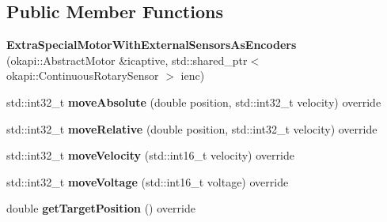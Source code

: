 \subsection*{Public Member Functions}
\begin{DoxyCompactItemize}
\item 
\mbox{\label{classExtraSpecialMotorWithExternalSensorsAsEncoders_a3fb898c76f246c08d0634933fea4a557}} 
{\bfseries Extra\+Special\+Motor\+With\+External\+Sensors\+As\+Encoders} (okapi\+::\+Abstract\+Motor \&icaptive, std\+::shared\+\_\+ptr$<$ okapi\+::\+Continuous\+Rotary\+Sensor $>$ ienc)
\item 
\mbox{\label{classExtraSpecialMotorWithExternalSensorsAsEncoders_af77f0f3c65fa7e19fd49a25b86694597}} 
std\+::int32\+\_\+t {\bfseries move\+Absolute} (double position, std\+::int32\+\_\+t velocity) override
\item 
\mbox{\label{classExtraSpecialMotorWithExternalSensorsAsEncoders_a688e2df620b1c931c448041ef2728966}} 
std\+::int32\+\_\+t {\bfseries move\+Relative} (double position, std\+::int32\+\_\+t velocity) override
\item 
\mbox{\label{classExtraSpecialMotorWithExternalSensorsAsEncoders_ae1378301e9848847026f342df66f6762}} 
std\+::int32\+\_\+t {\bfseries move\+Velocity} (std\+::int16\+\_\+t velocity) override
\item 
\mbox{\label{classExtraSpecialMotorWithExternalSensorsAsEncoders_a1dee79ad417eba651537ef56b32cd9c3}} 
std\+::int32\+\_\+t {\bfseries move\+Voltage} (std\+::int16\+\_\+t voltage) override
\item 
\mbox{\label{classExtraSpecialMotorWithExternalSensorsAsEncoders_a21482d2a303737d582961a90de113f62}} 
double {\bfseries get\+Target\+Position} () override
\item 
\mbox{\label{classExtraSpecialMotorWithExternalSensorsAsEncoders_a9661e8aef759e8a7784ac0f4eeddb5df}} 

\end{DoxyCompactItemize}
